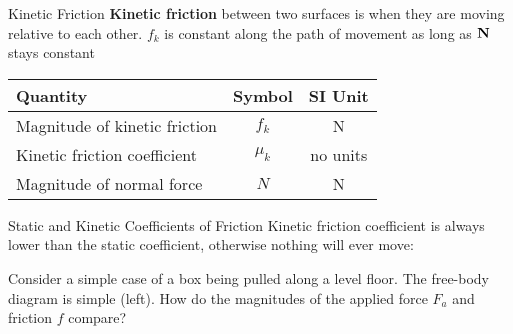 \documentclass[12pt,compress,aspectratio=169]{beamer}
\newcommand{\mb}[1]{\ensuremath\mathbf{#1}}
\newcommand{\eq}[2]{\vspace{#1}{\Large\begin{displaymath}#2\end{displaymath}}}
\begin{document}
\begin{frame}{Kinetic Friction}
  \textbf{Kinetic friction} between two surfaces is when they are moving
  relative to each other. $f_k$ is constant along the path of movement as long
  as $\mb{N}$ stays constant

  \eq{-.3in}{
    \boxed{f_k = \mu_kN}
  }
  \begin{center}
    \begin{tabular}{l|c|c}
      \rowcolor{pink}
      \textbf{Quantity} & \textbf{Symbol} & \textbf{SI Unit} \\ \hline
      Magnitude of kinetic friction & $f_k$ & \si{\newton} \\
      Kinetic friction coefficient  & $\mu_k$ & no units \\
      Magnitude of normal force     & $N$ & \si{\newton}
    \end{tabular}
  \end{center}
\end{frame}



\begin{frame}{Static and Kinetic Coefficients of Friction}    
  Kinetic friction coefficient is always lower than the static coefficient,
  otherwise nothing will ever move:
    
  \eq{-.45in}{
    \mu_k\leq\mu_s
  }

  \vspace{-.2in}Consider a simple case of a box being pulled along a level floor. The
  free-body diagram is simple (left). How do the magnitudes of the applied
  force $F_a$ and friction $f$ compare?

  \vspace{-.2in}
  \begin{columns}
    \begin{center}
    \end{center}

    \begin{center}
    \end{center}
  \end{columns}
\end{frame}
\end{document}
